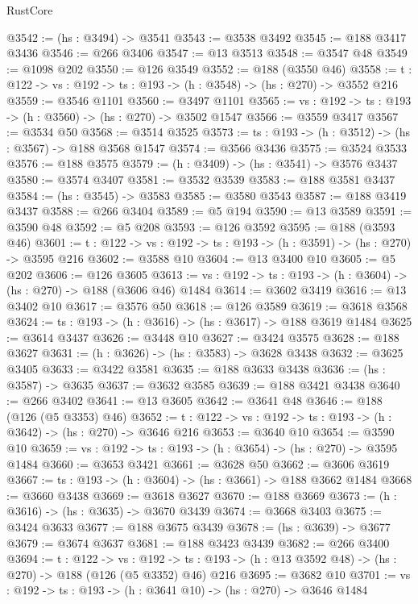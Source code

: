 \begin{lexlean}{RustCore}
\begin{coremodule}
@3542 := (hs : @3494) -> @3541
@3543 := @3538 @3492
@3545 := @188 @3417 @3436
@3546 := @266 @3406
@3547 := @13 @3513
@3548 := @3547 @48
@3549 := @1098 @202
@3550 := @126 @3549
@3552 := @188 (@3550 @46)
@3558 := {t : @122} -> {vs : @192} -> {ts : @193} -> (h : @3548) -> (hs : @270) -> @3552 @216
@3559 := @3546 @1101
@3560 := @3497 @1101
@3565 := {vs : @192} -> {ts : @193} -> (h : @3560) -> (hs : @270) -> @3502 @1547
@3566 := @3559 @3417
@3567 := @3534 @50
@3568 := @3514 @3525
@3573 := {ts : @193} -> (h : @3512) -> (hs : @3567) -> @188 @3568 @1547
@3574 := @3566 @3436
@3575 := @3524 @3533
@3576 := @188 @3575
@3579 := (h : @3409) -> (hs : @3541) -> @3576 @3437
@3580 := @3574 @3407
@3581 := @3532 @3539
@3583 := @188 @3581 @3437
@3584 := (hs : @3545) -> @3583
@3585 := @3580 @3543
@3587 := @188 @3419 @3437
@3588 := @266 @3404
@3589 := @5 @194
@3590 := @13 @3589
@3591 := @3590 @48
@3592 := @5 @208
@3593 := @126 @3592
@3595 := @188 (@3593 @46)
@3601 := {t : @122} -> {vs : @192} -> {ts : @193} -> (h : @3591) -> (hs : @270) -> @3595 @216
@3602 := @3588 @10
@3604 := @13 @3400 @10
@3605 := @5 @202
@3606 := @126 @3605
@3613 := {vs : @192} -> {ts : @193} -> (h : @3604) -> (hs : @270) -> @188 (@3606 @46) @1484
@3614 := @3602 @3419
@3616 := @13 @3402 @10
@3617 := @3576 @50
@3618 := @126 @3589
@3619 := @3618 @3568
@3624 := {ts : @193} -> (h : @3616) -> (hs : @3617) -> @188 @3619 @1484
@3625 := @3614 @3437
@3626 := @3448 @10
@3627 := @3424 @3575
@3628 := @188 @3627
@3631 := (h : @3626) -> (hs : @3583) -> @3628 @3438
@3632 := @3625 @3405
@3633 := @3422 @3581
@3635 := @188 @3633 @3438
@3636 := (hs : @3587) -> @3635
@3637 := @3632 @3585
@3639 := @188 @3421 @3438
@3640 := @266 @3402
@3641 := @13 @3605
@3642 := @3641 @48
@3646 := @188 (@126 (@5 @3353) @46)
@3652 := {t : @122} -> {vs : @192} -> {ts : @193} -> (h : @3642) -> (hs : @270) -> @3646 @216
@3653 := @3640 @10
@3654 := @3590 @10
@3659 := {vs : @192} -> {ts : @193} -> (h : @3654) -> (hs : @270) -> @3595 @1484
@3660 := @3653 @3421
@3661 := @3628 @50
@3662 := @3606 @3619
@3667 := {ts : @193} -> (h : @3604) -> (hs : @3661) -> @188 @3662 @1484
@3668 := @3660 @3438
@3669 := @3618 @3627
@3670 := @188 @3669
@3673 := (h : @3616) -> (hs : @3635) -> @3670 @3439
@3674 := @3668 @3403
@3675 := @3424 @3633
@3677 := @188 @3675 @3439
@3678 := (hs : @3639) -> @3677
@3679 := @3674 @3637
@3681 := @188 @3423 @3439
@3682 := @266 @3400
@3694 := {t : @122} ->
  {vs : @192} ->
  {ts : @193} -> (h : @13 @3592 @48) -> (hs : @270) -> @188 (@126 (@5 @3352) @46) @216
@3695 := @3682 @10
@3701 := {vs : @192} -> {ts : @193} -> (h : @3641 @10) -> (hs : @270) -> @3646 @1484

\end{coremodule}
\end{lexlean}
